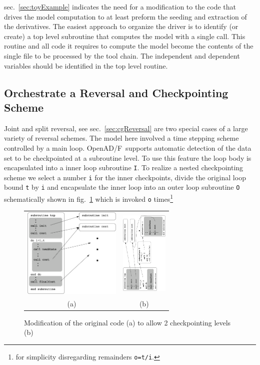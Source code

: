 \documentclass{book}
\newcommand{\OpenADF}{OpenAD/F}
\newcommand{\refsec}[1]{{sec.~\ref{#1}}}
\newcommand{\reffig}[1]{{fig.~\ref{#1}}}
\begin{document}
\refsec{sec:toyExample} indicates the need for a modification 
to the code that drives the model computation to at least 
preform the seeding and extraction of the derivatives. 
The easiest approach to organize the driver is to identify (or create) 
a top level subroutine that computes the model with a single call. 
This routine and all code it requires to compute the model 
become the contents of the single file to be processed by the tool chain.
The independent and dependent variables should be identified in the top level routine.  

\subsection{Orchestrate a Reversal and Checkpointing Scheme}
Joint and split reversal, see \refsec{sec:cgReversal} are two special cases 
of a large variety of reversal schemes. The model here involved a time stepping 
scheme controlled by a main loop. \OpenADF\ supports automatic detection of the 
data set to be checkpointed at a subroutine level. To use this feature the loop 
body is encapsulated into a inner loop subroutine \lstinline{I}. To realize a nested checkpointing scheme
we select a number \lstinline{i} for the inner checkpoints, 
divide the original loop bound \lstinline{t} by \lstinline{i} and encapsulate the inner loop 
into an outer loop subroutine \lstinline{O} schematically shown in \reffig{fig:checkpointLoops} 
which is invoked \lstinline{o} times\footnote{
for simplicity disregarding remainders \lstinline{o=t/i}.
}
\begin{figure}
\begin{tabular}{cc}
\begin{minipage}{5cm}
\includegraphics[height=4.3cm]{checkpointLoops}
\end{minipage}
&
\begin{minipage}{6cm}
\includegraphics[height=4cm]{checkpointLoopsNew2}
\end{minipage}\\
(a)& (b)
\end{tabular}
\caption{Modification of the original code (a) to allow 2 checkpointing levels (b)}\label{fig:checkpointLoops}
\end{figure}
\end{document}
